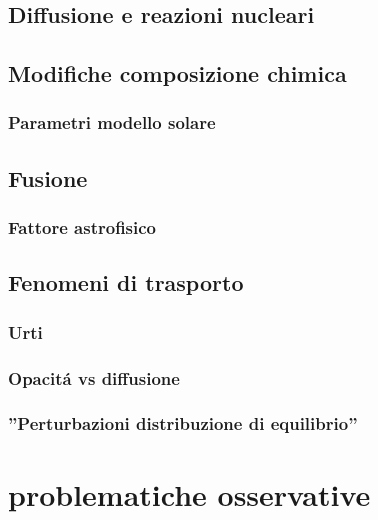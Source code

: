 \documentclass[../main.tex]{subfiles}
\begin{document}
\begin{refsection}
\nocite{*}

\chapter{Diffusione e reazioni nucleari}

\printbibliography[heading=subbibliography]

\section{Modifiche composizione chimica}

\subsection{Parametri modello solare}

\section{Fusione}

\subsection{Fattore astrofisico}

\section{Fenomeni di trasporto}

\subsection{Urti}

\subsection{Opacit\'a vs diffusione}

\subsection{''Perturbazioni distribuzione di equilibrio''}

\end{refsection}

\chapter{problematiche osservative}
\end{document}
